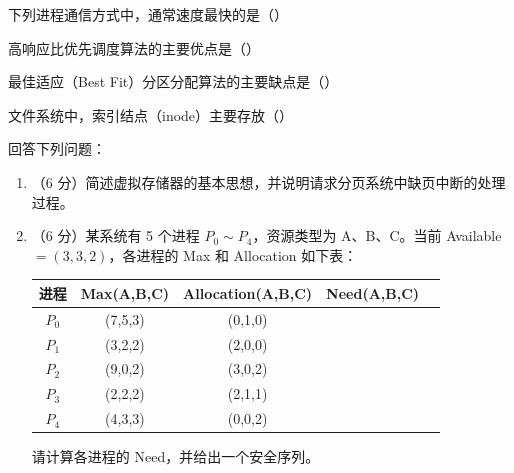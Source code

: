 \documentclass[a4paper,11pt]{article}
\begin{document}


\q 下列进程通信方式中，通常速度最快的是（\quad）

\q 高响应比优先调度算法的主要优点是（\quad）

\q 最佳适应（Best Fit）分区分配算法的主要缺点是（\quad）

\q 文件系统中，索引结点（inode）主要存放（\quad）


\q 回答下列问题：
\begin{enumerate}[label=（\arabic*）, leftmargin=2.4em, itemsep=2pt]
  \item （6 分）简述虚拟存储器的基本思想，并说明请求分页系统中缺页中断的处理过程。
  \item （6 分）某系统有 5 个进程 $P_0\sim P_4$，资源类型为 A、B、C。当前 Available $=(3,3,2)$，各进程的 Max 和 Allocation 如下表：
  \begin{center}\small
  \begin{tabular}{ccccc}
  \toprule
  进程 & Max(A,B,C) & Allocation(A,B,C) & Need(A,B,C) \\
  \midrule
  $P_0$ & (7,5,3) & (0,1,0) & \\
  $P_1$ & (3,2,2) & (2,0,0) & \\
  $P_2$ & (9,0,2) & (3,0,2) & \\
  $P_3$ & (2,2,2) & (2,1,1) & \\
  $P_4$ & (4,3,3) & (0,0,2) & \\
  \bottomrule
  \end{tabular}
  \end{center}
  请计算各进程的 Need，并给出一个安全序列。
\end{enumerate}
\anslines{9cm}

\end{document}
